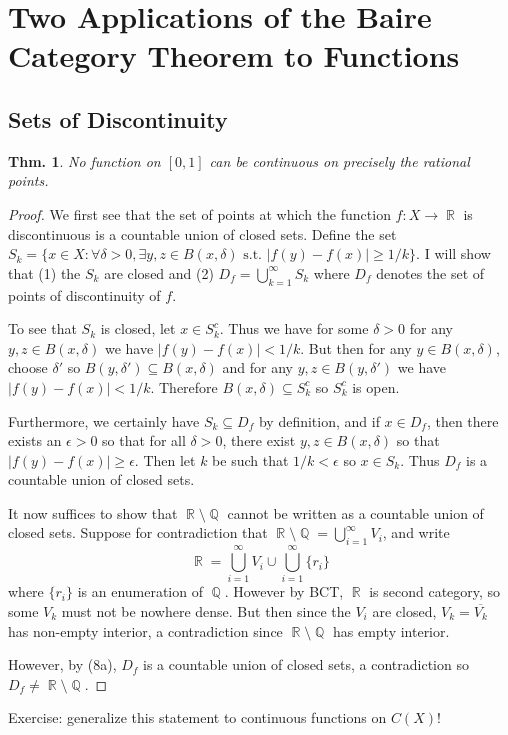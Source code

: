 \documentclass[12pt, a4paper]{book}
\DeclareMathOperator{\Q}{\mathbb{Q}}
\DeclareMathOperator{\R}{\mathbb{R}}
\newtheorem{theorem}{Thm.}[section]
\theoremstyle{nonumberplain}
\newtheorem{proof}{Proof}
\begin{document}
\section{Two Applications of the Baire Category Theorem to Functions}
\subsection{Sets of Discontinuity}
\begin{theorem}
    No function on $[0,1]$ can be continuous on precisely the rational points.
\end{theorem}
\begin{proof}
    We first see that the set of points at which the function $f:X\to\R$ is discontinuous is a countable union of closed sets.
    Define the set $S_k=\{x\in X:\forall\delta>0,\exists y,z\in B(x,\delta)\text{ s.t. }|f(y)-f(x)|\geq 1/k\}$.
    I will show that (1) the $S_k$ are closed and (2) $D_f=\bigcup_{k=1}^\infty S_k$ where $D_f$ denotes the set of points of discontinuity of $f$.

    To see that $S_k$ is closed, let $x\in S_k^c$.
    Thus we have for some $\delta>0$ for any  $y,z\in B(x,\delta)$ we have $|f(y)-f(x)|<1/k$.
    But then for any $y\in B(x,\delta)$, choose $\delta'$ so $B(y,\delta')\subseteq B(x,\delta)$ and for any $y,z\in B(y,\delta')$ we have $|f(y)-f(x)|<1/k$.
    Therefore $B(x,\delta)\subseteq S_k^c$ so $S_k^c$ is open.

    Furthermore, we certainly have $S_k\subseteq D_f$ by definition, and if $x\in D_f$, then there exists an $\epsilon>0$ so that for all $\delta>0$, there exist $y,z\in B(x,\delta)$ so that $|f(y)-f(x)|\geq\epsilon$.
    Then let $k$ be such that $1/k<\epsilon$ so $x\in S_k$.
    Thus $D_f$ is a countable union of closed sets.

    It now suffices to show that $\R\setminus\Q$ cannot be written as a countable union of closed sets.
    Suppose for contradiction that $\R\setminus\Q=\bigcup\limits_{i=1}^\infty V_i$, and write
    \[\R=\bigcup\limits_{i=1}^\infty V_i\cup\bigcup\limits_{i=1}^\infty\{r_i\}\]
    where $\{r_i\}$ is an enumeration of $\Q$.
    However by BCT, $\R$ is second category, so some $V_k$ must not be nowhere dense.
    But then since the $V_i$ are closed, $V_k=\overline{V_k}$ has non-empty interior, a contradiction since $\R\setminus\Q$ has empty interior.

    However, by (8a), $D_f$ is a countable union of closed sets, a contradiction so $D_f\neq\R\setminus\Q$.
\end{proof}
Exercise: generalize this statement to continuous functions on $C(X)$!
\end{document}
